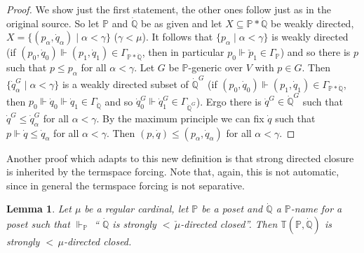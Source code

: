 \documentclass[a4paper]{amsart}
\theoremstyle{definition}
\theoremstyle{remark}
\theoremstyle{plain}
\newtheorem{mylem}[mydef]{Lemma}
\numberwithin{mydef}{section}
\newcommand{\dP}{\mathbb{P}}
\newcommand{\dQ}{\mathbb{Q}}
\newcommand{\dT}{\mathbb{T}}
\begin{document}
	\begin{proof}
		We show just the first statement, the other ones follow just as in the original source. So let $\dP$ and $\dot{\dQ}$ be as given and let $X\subseteq\dP*\dot{\dQ}$ be weakly directed, $X=\{(p_{\alpha},\dot{q}_{\alpha})\;|\;\alpha<\gamma\}$ ($\gamma<\mu$). It follows that $\{p_{\alpha}\;|\;\alpha<\gamma\}$ is weakly directed (if $(p_0,\dot{q}_0)\Vdash(p_1,\dot{q}_1)\in\Gamma_{\dP*\dot{\dQ}}$, then in particular $p_0\Vdash\check{p}_1\in\Gamma_{\dP}$) and so there is $p$ such that $p\leq p_{\alpha}$ for all $\alpha<\gamma$. Let $G$ be $\dP$-generic over $V$ with $p\in G$. Then $\{\dot{q}_{\alpha}^G\;|\;\alpha<\gamma\}$ is a weakly directed subset of $\dot{\dQ}^G$ (if $(p_0,\dot{q}_0)\Vdash(p_1,\dot{q}_1)\in\Gamma_{\dP*\dot{\dQ}}$, then $p_0\Vdash\dot{q}_0\Vdash\dot{q}_1\in\Gamma_{\dot{\dQ}}$ and so $\dot{q}_0^G\Vdash\dot{q}_1^G\in\Gamma_{\dot{\dQ}^G}$). Ergo there is $\dot{q}^G\in\dot{\dQ}^G$ such that $\dot{q}^G\leq\dot{q}_{\alpha}^G$ for all $\alpha<\gamma$. By the maximum principle we can fix $\dot{q}$ such that $p\Vdash\dot{q}\leq\dot{q}_{\alpha}$ for all $\alpha<\gamma$. Then $(p,\dot{q})\leq(p_{\alpha},\dot{q}_{\alpha})$ for all $\alpha<\gamma$.
	\end{proof}
	
	Another proof which adapts to this new definition is that strong directed closure is inherited by the termspace forcing. Note that, again, this is not automatic, since in general the termspace forcing is not separative.
	
	\begin{mylem}\label{TermspaceStrongDirect}
		Let $\mu$ be a regular cardinal, let $\dP$ be a poset and $\dot{\dQ}$ a $\dP$-name for a poset such that $\Vdash_{\dP}$ `` $\dot{\dQ}$ is strongly ${<}\,\check{\mu}$-directed closed''. Then $\dT(\dP,\dot{\dQ})$ is strongly ${<}\,\mu$-directed closed.
	\end{mylem}
	
\end{document}
